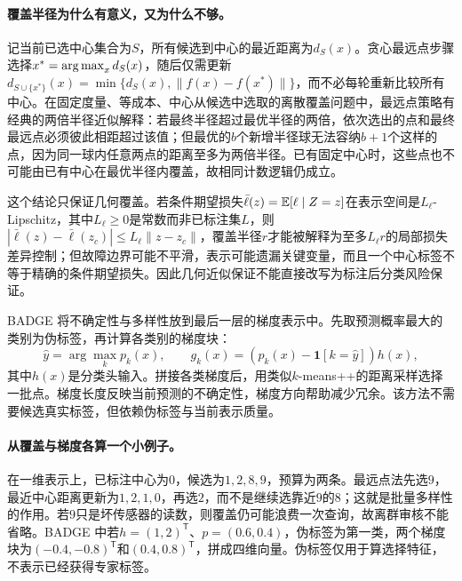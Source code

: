 \paragraph{覆盖半径为什么有意义，又为什么不够。}
记当前已选中心集合为$S$，所有候选到中心的最近距离为$d_S(x)$。贪心最远点步骤选择$x^*=\mathop{\mathrm{arg\,max}}_xd_S(x)$，随后仅需更新$d_{S\cup\{x^*\}}(x)=\min\{d_S(x),\|f(x)-f(x^*)\|\}$，而不必每轮重新比较所有中心。在固定度量、等成本、中心从候选中选取的离散覆盖问题中，最远点策略有经典的两倍半径近似解释：若最终半径超过最优半径的两倍，依次选出的点和最终最远点必须彼此相距超过该值；但最优的$b$个新增半径球无法容纳$b+1$个这样的点，因为同一球内任意两点的距离至多为两倍半径。已有固定中心时，这些点也不可能由已有中心在最优半径内覆盖，故相同计数逻辑仍成立。

这个结论只保证几何覆盖。若条件期望损失$\bar\ell(z)=\mathbb{E}[\ell\mid Z=z]$在表示空间是$L_\ell$-Lipschitz，其中$L_\ell\geq0$是常数而非已标注集$L$，则$|\bar\ell(z)-\bar\ell(z_c)|\leq L_\ell\|z-z_c\|$，覆盖半径$r$才能被解释为至多$L_\ell r$的局部损失差异控制；但故障边界可能不平滑，表示可能遗漏关键变量，而且一个中心标签不等于精确的条件期望损失。因此几何近似保证不能直接改写为标注后分类风险保证。

BADGE 将不确定性与多样性放到最后一层的梯度表示中\cite{ash2020badge}。先取预测概率最大的类别为伪标签，再计算各类别的梯度块：
\begin{equation}
 \hat y=\arg\max_kp_k(x),\qquad
 g_k(x)=(p_k(x)-\mathbf1[k=\hat y])h(x),\label{eq:active-badge-embedding}
\end{equation}
其中$h(x)$是分类头输入。拼接各类梯度后，用类似$k$-means++的距离采样选择一批点。梯度长度反映当前预测的不确定性，梯度方向帮助减少冗余。该方法不需要候选真实标签，但依赖伪标签与当前表示质量。

\paragraph{从覆盖与梯度各算一个小例子。}
在一维表示上，已标注中心为$0$，候选为$1,2,8,9$，预算为两条。最远点法先选$9$，最近中心距离更新为$1,2,1,0$，再选$2$，而不是继续选靠近$9$的$8$；这就是批量多样性的作用。若$9$只是坏传感器的读数，则覆盖仍可能浪费一次查询，故离群审核不能省略。BADGE 中若$h=(1,2)^{\mathsf T}$、$p=(0.6,0.4)$，伪标签为第一类，两个梯度块为$(-0.4,-0.8)^{\mathsf T}$和$(0.4,0.8)^{\mathsf T}$，拼成四维向量。伪标签仅用于算选择特征，不表示已经获得专家标签。

